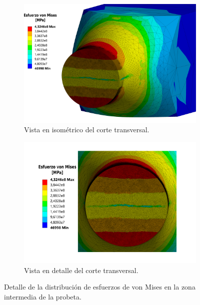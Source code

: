 \begin{figure}[p]
	\ContinuedFloat
	\centering
	\begin{subfigure}{0.95\linewidth}
		\centering
		\includegraphics[width=\linewidth]{Imagenes/rcorte_iso.pdf}
		\caption{Vista en isométrico del corte transversal.}
		\label{fig:rcorte_iso}
	\end{subfigure}		
	\begin{subfigure}{0.95\linewidth}
		\centering
		\includegraphics[width=\linewidth]{Imagenes/rcorte.pdf}
		\caption{Vista en detalle del corte transversal.}
		\label{fig:rcorte}
	\end{subfigure}
\caption{Detalle de la distribución de esfuerzos de von Mises en la zona intermedia de la probeta.}
\label{fig:resultados_vm}
\end{figure}

